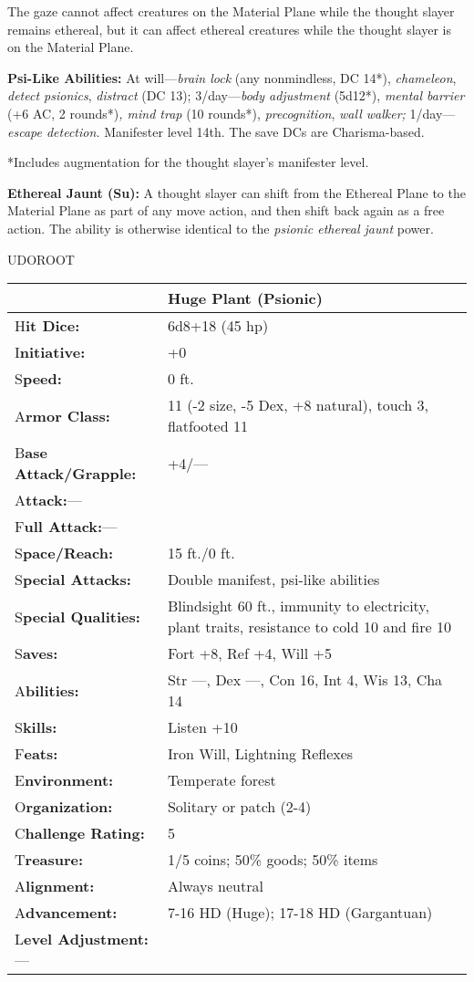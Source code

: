 \documentclass{article}
\begin{document}
The gaze cannot affect creatures on the Material Plane while the thought slayer 
remains ethereal, but it can affect ethereal creatures while the thought slayer 
is on the Material Plane.

\textbf{Psi-Like Abilities:} At will---\textit{brain lock }(any nonmindless, DC 
14*), \textit{chameleon}, \textit{detect psionics}, \textit{distract }(DC 13); 
3/day---\textit{body adjustment }(5d12*), \textit{mental barrier }(+6 AC, 2 rounds*)\textit{, 
mind trap }(10 rounds*), \textit{precognition}, \textit{wall walker; }1/day---\textit{escape 
detection. }Manifester level 14th. The save DCs are Charisma-based.

*Includes augmentation for the thought slayer's manifester level.

\textbf{Ethereal Jaunt (Su):} A thought slayer can shift from the Ethereal Plane 
to the Material Plane as part of any move action, and then shift back again as 
a free action. The ability is otherwise identical to the \textit{psionic ethereal 
jaunt }power.

\vspace{12pt}
{\LARGE{}UDOROOT}

\begin{tabular}{|>{\raggedright}p{91pt}|>{\raggedright}p{232pt}|}
\hline
  & Huge Plant (Psionic)\tabularnewline
\hline
H\textbf{it Dice:} & 6d8+18 (45 hp)\tabularnewline
\hline
I\textbf{nitiative:} & +0\tabularnewline
\hline
S\textbf{peed:} & 0 ft.\tabularnewline
\hline
A\textbf{rmor Class:} & 11 (-2 size, -5 Dex, +8 natural), touch 3, flatfooted 11\tabularnewline
\hline
B\textbf{ase Attack/Grapple:} & +4/---\tabularnewline
\hline
A\textbf{ttack:}--- & \tabularnewline
\hline
F\textbf{ull Attack:}--- & \tabularnewline
\hline
S\textbf{pace/Reach:} & 15 ft./0 ft.\tabularnewline
\hline
S\textbf{pecial Attacks:} & Double manifest, psi-like abilities\tabularnewline
\hline
S\textbf{pecial Qualities:} & Blindsight 60 ft., immunity to electricity, plant 
traits, resistance to cold 10 and fire 10\tabularnewline
\hline
S\textbf{aves:} & Fort +8, Ref +4, Will +5\tabularnewline
\hline
A\textbf{bilities:} & Str ---, Dex ---, Con 16, Int 4, Wis 13, Cha 14\tabularnewline
\hline
S\textbf{kills:} & Listen +10\tabularnewline
\hline
F\textbf{eats:} & Iron Will, Lightning Reflexes\tabularnewline
\hline
E\textbf{nvironment:} & Temperate forest\tabularnewline
\hline
O\textbf{rganization:} & Solitary or patch (2-4)\tabularnewline
\hline
C\textbf{hallenge Rating:} & 5\tabularnewline
\hline
T\textbf{reasure:} & 1/5 coins; 50\% goods; 50\% items\tabularnewline
\hline
A\textbf{lignment:} & Always neutral\tabularnewline
\hline
A\textbf{dvancement:} & 7-16 HD (Huge); 17-18 HD (Gargantuan)\tabularnewline
\hline
L\textbf{evel Adjustment:}--- & \tabularnewline
\hline
\end{tabular}
\end{document}
